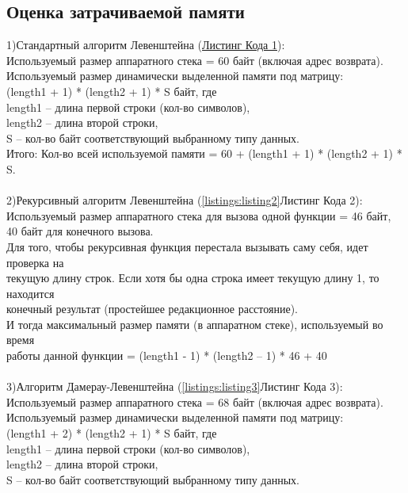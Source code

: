 \documentclass[a4paper,12pt]{article}
\begin{document}
\subsection{Оценка затрачиваемой памяти}
1)Стандартный алгоритм Левенштейна (\hyperref[listings:listing1]{Листинг Кода 1}): \\
Используемый размер аппаратного стека = 60 байт (включая адрес возврата). \\
Используемый размер динамически выделенной памяти под матрицу: \\
(length1 + 1) * (length2 + 1) * S байт, где \\
length1 – длина первой строки (кол-во символов), \\
length2 – длина второй строки, \\
S – кол-во байт соответствующий выбранному типу данных. \\
Итого: Кол-во всей используемой памяти = 60 + (length1 + 1) * (length2 + 1) * S. \\
\\
2)Рекурсивный алгоритм Левенштейна (\ref{listings:listing2}Листинг Кода 2): \\
Используемый размер аппаратного стека для вызова одной функции = 46 байт, \\
40 байт для конечного вызова. \\
Для того, чтобы рекурсивная функция перестала вызывать саму себя, идет проверка на \\
текущую длину строк. Если хотя бы одна строка имеет текущую длину 1, то находится \\
конечный результат (простейшее редакционное расстояние). \\
И тогда максимальный размер памяти (в аппаратном стеке), используемый во время \\
работы данной функции = (length1 - 1) * (length2 – 1) * 46 + 40 \\
\\
3)Алгоритм Дамерау-Левенштейна (\ref{listings:listing3}Листинг Кода 3): \\
Используемый размер аппаратного стека = 68 байт (включая адрес возврата). \\
Используемый размер динамически выделенной памяти под матрицу: \\
(length1 + 2) * (length2 + 1) * S байт, где \\
length1 – длина первой строки (кол-во символов), \\
length2 – длина второй строки, \\
S – кол-во байт соответствующий выбранному типу данных. \\
\end{document}
